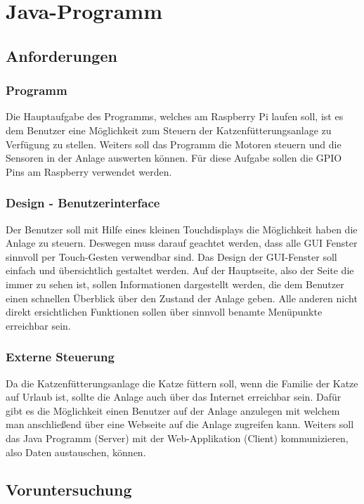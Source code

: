 
\chapter{Java-Programm}
\label{sec:java-programm}

\section{Anforderungen}
\subsection{Programm}
Die Hauptaufgabe des Programms, welches am Raspberry Pi laufen soll, ist es dem Benutzer eine Möglichkeit zum Steuern der Katzenfütterungsanlage zu Verfügung zu stellen. Weiters soll das Programm die Motoren steuern und die Sensoren in der Anlage auswerten können. Für diese Aufgabe sollen die \ac{GPIO} Pins am Raspberry verwendet werden.
\subsection{Design - Benutzerinterface}
Der Benutzer soll mit Hilfe eines kleinen Touchdisplays die Möglichkeit haben die Anlage zu steuern. Deswegen muss darauf geachtet werden, dass alle \ac{GUI} Fenster sinnvoll per Touch-Gesten verwendbar sind.
Das Design der \ac{GUI}-Fenster soll einfach und übersichtlich gestaltet werden. Auf der Hauptseite, also der Seite die immer zu sehen ist, sollen Informationen dargestellt werden, die dem Benutzer einen schnellen Überblick über den Zustand der Anlage geben. Alle anderen nicht direkt ersichtlichen Funktionen sollen über sinnvoll benamte Menüpunkte erreichbar sein.
\subsection{Externe Steuerung}
Da die Katzenfütterungsanlage die Katze füttern soll, wenn die Familie der Katze auf Urlaub ist, sollte die Anlage auch über das Internet erreichbar sein. Dafür gibt es die Möglichkeit einen Benutzer auf der Anlage anzulegen mit welchem man anschließend über eine Webseite auf die Anlage zugreifen kann. Weiters soll das Java Programm (Server) mit der Web-Applikation (Client) kommunizieren, also Daten austauschen, können.

\newpage

\section{Voruntersuchung}
